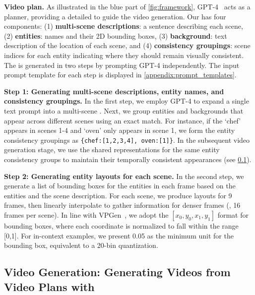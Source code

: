 \documentclass{article}
\begin{document}
\vspace{5pt}
\noindent\textbf{Video plan.}
As illustrated in the \textcolor{ProcessBlue}{blue} part of \cref{fig:framework}, GPT-4~\citep{openai2023gpt4} 
acts as a planner, providing a detailed \textit{\videoplan{}} 
to guide the video generation.
Our \videoplan{} has four components:
(1) \textbf{multi-scene descriptions}: a sentence describing each scene, 
(2) \textbf{entities}: names and their 2D bounding boxes, 
(3) \textbf{background}: text description of the location of each scene,
and (4) \textbf{consistency groupings}:
scene indices for each entity indicating where they should remain visually consistent.
The \videoplan{} is generated in two steps by prompting GPT-4 independently. 
The input prompt template for each step is displayed in \cref{appendix:prompt_templates}.



\vspace{5pt}
\noindent\textbf{Step 1: Generating multi-scene descriptions, entity names, and consistency groupings.}
In the first step, we employ GPT-4 to expand a single text prompt into a multi-scene \videoplan{}.
Next, we group entities and backgrounds that appear across different scenes using an exact match. For instance, if the `chef' appears in scenes 1-4 and `oven' only appears in scene 1, we form the entity consistency groupings as \texttt{\{chef:[1,2,3,4], oven:[1]\}}. 
In the subsequent video generation stage, we use the
shared representations for the same entity consistency groups to maintain their temporally consistent appearances (see \cref{sec:grounded_video_generation}).



\vspace{5pt}
\noindent\textbf{Step 2: Generating entity layouts for each scene.}
In the second step,
we generate a list of bounding boxes for the entities in each frame based on the entities and the scene description. For each scene, we produce layouts for 9 frames, then linearly interpolate to gather information for denser frames (\eg{}, 16 frames per scene).
In line with VPGen~\citep{cho2023visual}, we adopt the $[x_0, y_0, x_1, y_1]$ format for bounding boxes, where each coordinate is normalized to fall within the range [0,1].
For in-context examples, we present 0.05 as the minimum unit for the bounding box, equivalent to a 20-bin quantization. 






\subsection{Video Generation: Generating Videos from Video Plans with \videomodule{}}
\label{sec:grounded_video_generation}
\end{document}
